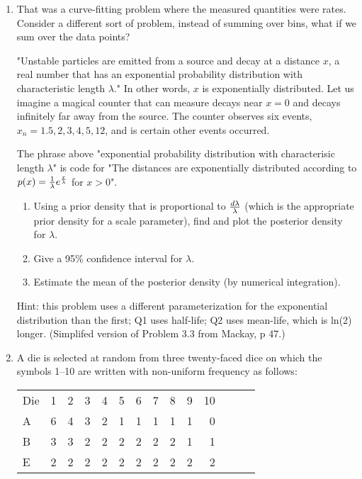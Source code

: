 \documentclass[12pt]{book}
\theoremstyle{definition}
\begin{document}
\begin{enumerate}
\item
That was a curve-fitting problem where the measured quantities were rates.  Consider a different sort of problem, instead of summing over bins, what if we sum over the data points?

"Unstable particles are emitted from a source and decay at a distance $x$, a real number that has an exponential probability distribution with characteristic length $\lambda$."  In other words, $x$ is exponentially distributed. Let us imagine a magical counter that can measure decays near $x=0$ and decays infinitely far away from the source. The counter observes six events, ${x_n} =  {1.5,2,3,4,5,12}$, and is certain other events occurred. 

The phrase above "exponential probability distribution with characterisic length $\lambda$" is code for "The distances are exponentially distributed according to $p(x) = {{ 1 \over \lambda} e^{x \over \lambda} } $ for $x>0$". 

\begin{enumerate}[label=\alph*)]
  \item 	Using a prior density that is proportional to ${d\lambda }\over {\lambda}$ (which is the appropriate prior density for a scale parameter), find and plot the posterior density for $\lambda$. 
  \item  Give a 95\% confidence interval for $\lambda$.
  \item  Estimate the mean of the posterior density (by numerical integration).
\end{enumerate}
Hint:  this problem uses a different parameterization for the exponential distribution than the first; Q1 uses half-life; Q2 uses mean-life, which is ln(2) longer. 
(Simplifed version of Problem 3.3 from Mackay, p 47.)

\item\label{loadeddie} A die is selected at random from three twenty-faced dice on which the symbols 1–10 are written with non-uniform frequency as follows: 

\begin{tabular} {l r r r r r r r r r r r r r}
Die & 1 & 2 & 3 & 4 & 5 & 6 & 7 & 8 & 9 & 10 \\
A & 6 & 4 & 3 & 2 & 1 & 1 & 1 & 1 & 1 & 0  \\
B & 3 & 3 & 2 & 2 & 2 & 2 & 2 & 2 & 1 & 1 \\
E & 2 & 2 & 2 & 2 & 2 & 2 & 2 & 2 & 2 & 2 \\
\end{tabular}


\end{enumerate}
\end{document}
